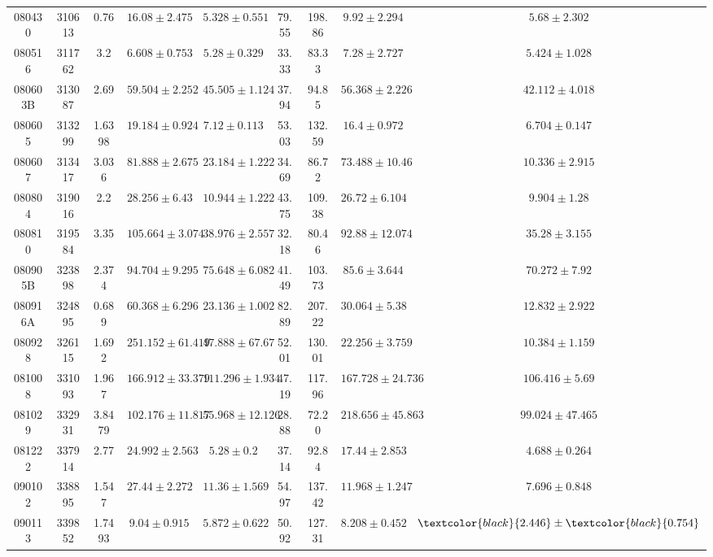 \documentclass[prd,nofootinbib,preprintnumbers,floatfix]{revtex4}  %
\newcommand{\rthis}[1]{\textcolor{black}{#1}}
\begin{document}
\begin{center}
\begin{longtable*}{|c|c|c|c|c|c|c|c|c|}
080430	&	310613	&	0.76	&	$	16.08	\pm	2.475	$	&	$	5.328	\pm	0.551	$	&	79.55	&	198.86	&	$	9.92	\pm	2.294	$	&	$	5.68	\pm	2.302	$	\\
080516	&	311762	&	3.2	&	$	6.608	\pm	0.753	$	&	$	5.28	\pm	0.329	$	&	33.33	&	83.33	&	$	7.28	\pm	2.727	$	&	$	5.424	\pm	1.028	$	\\
080603B	&	313087	&	2.69	&	$	59.504	\pm	2.252	$	&	$	45.505	\pm	1.124	$	&	37.94	&	94.85	&	$	56.368	\pm	2.226	$	&	$	42.112	\pm	4.018	$	\\
080605	&	313299	&	1.6398	&	$	19.184	\pm	0.924	$	&	$	7.12	\pm	0.113	$	&	53.03	&	132.59	&	$	16.4	\pm	0.972	$	&	$	6.704	\pm	0.147	$	\\
080607	&	313417	&	3.036	&	$	81.888	\pm	2.675	$	&	$	23.184	\pm	1.222	$	&	34.69	&	86.72	&	$	73.488	\pm	10.46	$	&	$	10.336	\pm	2.915	$	\\
080804	&	319016	&	2.2	&	$	28.256	\pm	6.43	$	&	$	10.944	\pm	1.222	$	&	43.75	&	109.38	&	$	26.72	\pm	6.104	$	&	$	9.904	\pm	1.28	$	\\
080810	&	319584	&	3.35	&	$	105.664	\pm	3.074	$	&	$	38.976	\pm	2.557	$	&	32.18	&	80.46	&	$	92.88	\pm	12.074	$	&	$	35.28	\pm	3.155	$	\\
080905B	&	323898	&	2.374	&	$	94.704	\pm	9.295	$	&	$	75.648	\pm	6.082	$	&	41.49	&	103.73	&	$	85.6	\pm	3.644	$	&	$	70.272	\pm	7.92	$	\\
080916A	&	324895	&	0.689	&	$	60.368	\pm	6.296	$	&	$	23.136	\pm	1.002	$	&	82.89	&	207.22	&	$	30.064	\pm	5.38	$	&	$	12.832	\pm	2.922	$	\\
080928	&	326115	&	1.692	&	$	251.152	\pm	61.419	$	&	$	47.888	\pm	67.67	$	&	52.01	&	130.01	&	$	22.256	\pm	3.759	$	&	$	10.384	\pm	1.159	$	\\
081008	&	331093	&	1.967	&	$	166.912	\pm	33.379	$	&	$	111.296	\pm	1.934	$	&	47.19	&	117.96	&	$	167.728	\pm	24.736	$	&	$	106.416	\pm	5.69	$	\\
081029	&	332931	&	3.8479	&	$	102.176	\pm	11.817	$	&	$	55.968	\pm	12.126	$	&	28.88	&	72.20	&	$	218.656	\pm	45.863	$	&	$	99.024	\pm	47.465	$	\\
081222	&	337914	&	2.77	&	$	24.992	\pm	2.563	$	&	$	5.28	\pm	0.2	$	&	37.14	&	92.84	&	$	17.44	\pm	2.853	$	&	$	4.688	\pm	0.264	$	\\
090102	&	338895	&	1.547	&	$	27.44	\pm	2.272	$	&	$	11.36	\pm	1.569	$	&	54.97	&	137.42	&	$	11.968	\pm	1.247	$	&	$	7.696	\pm	0.848	$	\\
090113	&	339852	&	1.7493	&	$	9.04	\pm	0.915	$	&	$	5.872	\pm	0.622	$	&	50.92	&	127.31	&	$	8.208	\pm	0.452	$	&	$	\rthis{2.446}	\pm	\rthis{0.754}	$	\\

\end{longtable*}
\end{center}
\end{document}
